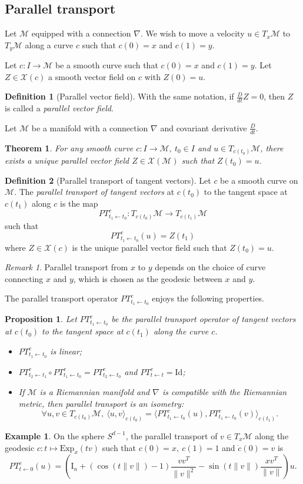 \documentclass[10pt,a4paper]{book}
\theoremstyle{definition}
\newtheorem{defn}{Definition}[section]
\newtheorem{exm}{Example}[section]
\theoremstyle{plain}
\newtheorem{thm}{Theorem}[section]
\newtheorem{prop}{Proposition}[section]
\theoremstyle{remark}
\newtheorem{rmk}{Remark}[section]
\newcommand \M {\mathcal{M}}
\newcommand \X {\mathcal{X}}
\begin{document}
\subsection{Parallel transport}
Let $\M$ equipped with a connection $\nabla$. We wish to move a velocity $u\in T_x\M$ to $T_y\M$ along a curve $c$ such that $c(0)=x$ and $c(1)=y$.
\par \medskip
Let $c:I\to \M$ be a smooth curve such that $c(0)=x$ and $c(1)=y$. Let $Z\in \X(c)$ a smooth vector field on $c$ with $Z(0)=u$. 
\begin{defn}[Parallel vector field]
With the same notation, if $\frac{D}{dt}Z=0$, then $Z$ is called a \emph{parallel vector field}.
\end{defn}
Let $\M$ be a manifold with a connection $\nabla$ and covariant derivative $\frac{D}{dt}$. 
\begin{thm}
For any smooth curve $c:I\to \M,~t_0\in I$ and $u\in T_{c(t_0)}\M$, there exists a unique parallel vector field $Z\in \X(\M)$ such that $Z(t_0)=u$.
\end{thm}
\begin{defn}[Parallel transport of tangent vectors]
Let $c$ be a smooth curve on $\M$. The \emph{parallel transport of tangent vectors } at $c(t_0)$ to the tangent space at $c(t_1)$ along $c$ is the map
$$PT^{c}_{t_1\leftarrow t_0}: T_{c(t_0)}\M \to T_{c(t_1)}\M$$
such that
$$PT^{c}_{t_1\leftarrow t_0}(u)=Z(t_1)$$
where $Z\in \X(c)$ is the unique parallel vector field such that $Z(t_0)=u$. 
\end{defn}
\begin{rmk}
Parallel transport from $x$ to $y$ depends on the choice of curve connecting $x$ and $y$, which is chosen as the geodesic between $x$ and $y$.
\end{rmk}
The parallel transport operator $PT^{c}_{t_1\leftarrow t_0}$ enjoys the following properties.
\begin{prop}
Let $PT^{c}_{t_1\leftarrow t_0}$ be the parallel transport operator of tangent vectors at $c(t_0)$ to the tangent space at $c(t_1)$ along the curve $c$.
\begin{itemize}
\item $PT^{c}_{t_1\leftarrow t_0}$ is linear;
\item $PT^{c}_{t_2\leftarrow t_1}\circ PT^{c}_{t_1\leftarrow t_0} =PT^{c}_{t_2\leftarrow t_0}$ and $PT^{c}_{t\leftarrow t}=\text{Id}$;
\item If $\M$ is a Riemannian manifold and $\nabla$ is compatible with the Riemannian metric, then parallel transport is an isometry:
$$\forall u,v\in T_{c(t_0)}\M,~\langle u,v\rangle_{c(t_0)}=\langle PT^{c}_{t_1\leftarrow t_0}(u),PT^{c}_{t_1\leftarrow t_0} (v)\rangle_{c(t_1)}.$$ 
\end{itemize}
\end{prop}
\begin{exm}
On the sphere $S^{d-1}$, the parallel transport of $v\in T_x\M$ along the geodesic $c:t\mapsto \text{Exp}_x(tv)$ such that $c(0)=x,~c(1)=1$ and $\dot{c}(0)=v$ is
$$PT^{c}_{t\leftarrow 0}(u)=\left(\text{I}_n+(\cos(t\|v\|)-1)\frac{vv^{T}}{\|v\|^2}-\sin(t\|v\|)\frac{xv^{T}}{\|v\|}\right)u.$$
\end{exm}
\end{document}
